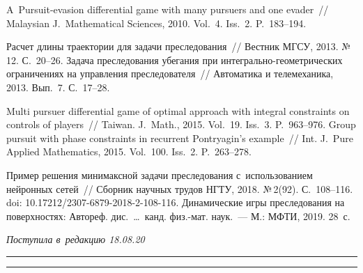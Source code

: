 \begin{multicols}{2}
{{\begin{thebibliography}{99}
 A~Pursuit-evasion differential game with many pursuers and one 
evader~// Malaysian J.~Mathematical Sciences, 2010. Vol.~4. Iss.~2. P.~183--194.

 Расчет длины траектории для задачи преследования~// 
Вестник МГСУ, 2013. №\,12. С.~20--26.
 Задача преследования убегания при  
ин\-тег\-раль\-но-гео\-мет\-ри\-че\-ских ограничениях на управ\-ле\-ния преследователя~// 
Автоматика и телемеханика, 2013. Вып.~7. С.~17--28.

 Multi pursuer differential game of 
optimal approach with integral constraints on controls of players~// Taiwan. J.~Math., 
2015. Vol.~19. Iss.~3. P.~963--976.
 Group pursuit with phase constraints in recurrent Pontryagin's 
example~// Int. J.~Pure Applied Mathematics, 2015. Vol.~100. Iss.~2. P.~263--278.

 Пример решения минимаксной задачи преследования 
с~использованием нейронных сетей~// Сборник научных трудов НГТУ, 2018. №\,2(92). 
С.~108--116. doi: 10.17212/2307-6879-2018-2-108-116.
 Динамические игры преследования на поверхностях: Автореф. дис.\ 
\ldots\ канд. физ.-мат. наук.~--- М.: МФТИ, 2019. 28~с.


\end{thebibliography}

 }
 }

\end{multicols}

\vspace*{-6pt}

\hfill{\small\textit{Поступила в~редакцию 18.08.20}}

\vspace*{8pt}




\hrule

\vspace*{2pt}

\hrule


\def\tit{KINEMATIC MODELS OF~PURSUIT PROBLEMS ON~THE~PLANE BY~THE~METHODS 
OF~PARALLEL APPROACH AND~PURSUIT}


